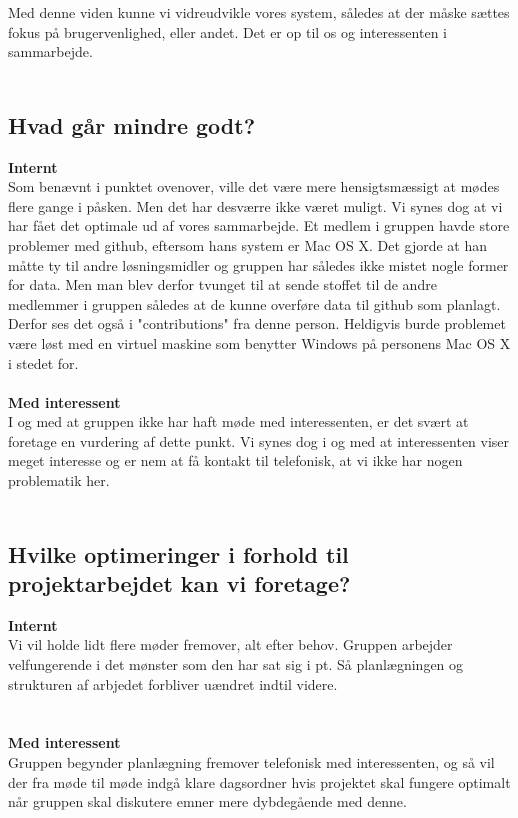 \documentclass[a4paper,12pt]{article}
\begin{document}
Med denne viden kunne vi vidreudvikle vores system, således at der måske sættes fokus på brugervenlighed, eller andet. Det er op til os og interessenten i sammarbejde.
\\
\\
\subsection{Hvad går mindre godt?}

\textbf{Internt}
\\
Som benævnt i punktet ovenover, ville det være mere hensigtsmæssigt at mødes flere gange i påsken. Men det har desværre ikke været muligt. Vi synes dog at vi har fået det optimale ud af vores sammarbejde.
Et medlem i gruppen havde store problemer med github, eftersom hans system er Mac OS X. Det gjorde at han måtte ty til andre løsningsmidler og gruppen har således ikke mistet nogle former for data. Men man blev derfor tvunget til at sende stoffet til de andre medlemmer i gruppen således at de kunne overføre data til github som planlagt. Derfor ses det også i "contributions" fra denne person. Heldigvis burde problemet være løst med en virtuel maskine som benytter Windows på personens Mac OS X i stedet for.
\\
\\
\textbf{Med interessent}
\\
I og med at gruppen ikke har haft møde med interessenten, er det svært at foretage en vurdering af dette punkt. Vi synes dog i og med at interessenten viser meget interesse og er nem at få kontakt til telefonisk, at vi ikke har nogen problematik her. 
\\
\\
\subsection{Hvilke optimeringer i forhold til projektarbejdet kan vi foretage?}

\textbf{Internt}
\\
Vi vil holde lidt flere møder fremover, alt efter behov. Gruppen arbejder velfungerende i det mønster som den har sat sig i pt. Så planlægningen og strukturen af arbjedet forbliver uændret indtil videre.
\\ 
\\
\\
\textbf{Med interessent}
\\
Gruppen begynder planlægning fremover telefonisk med interessenten, og så vil der fra møde til møde indgå klare dagsordner hvis projektet skal fungere optimalt når gruppen skal diskutere emner mere dybdegående med denne.  
\end{document}
